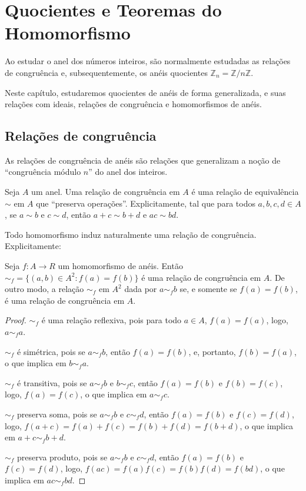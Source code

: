 \chapter{Quocientes e Teoremas do Homomorfismo}

Ao estudar o anel dos números inteiros, são normalmente estudadas as relações de congruência e, subsequentemente, os anéis quocientes $\mathbb Z_n=\mathbb Z/n\mathbb Z$.

Neste capítulo, estudaremos quocientes de anéis de forma generalizada, e suas relações com ideais, relações de congruência e homomorfismos de anéis.

\section{Relações de congruência}
As relações de congruência de anéis são relações que generalizam a noção de ``congruência módulo $n$'' do anel dos inteiros.

\begin{definition}
    Seja $A$ um anel. Uma relação de congruência em $A$ é uma relação de equivalência $\sim$ em $A$ que ``preserva operações''.
    Explicitamente, tal que para todos $a, b, c, d \in A$, se $a\sim b$ e $c\sim d$, então $a+c\sim b+d$ e $ac\sim bd$.
\end{definition}

Todo homomorfismo induz naturalmente uma relação de congruência.
Explicitamente:

\begin{prop}
Seja $f: A\rightarrow R$ um homomorfismo de anéis.
Então $\sim_f=\{(a, b) \in A^2: f(a)=f(b)\}$ é uma relação de congruência em $A$.
De outro modo, a relação $\sim_f$ em $A^2$ dada por $a \sim_f b$ se, e somente se $f(a)=f(b)$, é uma relação de congruência em $A$.
\end{prop}

\begin{proof}
    $\sim_f$ é uma relação reflexiva, pois para todo $a \in A$, $f(a)=f(a)$, logo, $a\sim_f a$.

    $\sim_f$ é simétrica, pois se $a\sim_f b$, então $f(a)=f(b)$, e, portanto, $f(b)=f(a)$, o que implica em $b\sim_f a$.

    $\sim_f$ é transitiva, pois se $a\sim_f b$ e $b\sim_f c$, então $f(a)=f(b)$ e $f(b)=f(c)$, logo, $f(a)=f(c)$, o que implica em $a\sim_f c$.

    $\sim_f$ preserva soma, pois se $a\sim_f b$ e $c\sim_f d$, então $f(a)=f(b)$ e $f(c)=f(d)$, logo, $f(a+c)=f(a)+f(c)=f(b)+f(d)=f(b+d)$, o que implica em $a+c\sim_f b+d$.

    $\sim_f$ preserva produto, pois se $a\sim_f b$ e $c\sim_f d$, então $f(a)=f(b)$ e $f(c)=f(d)$, logo, $f(ac)=f(a)f(c)=f(b)f(d)=f(bd)$, o que implica em $ac\sim_f bd$.
\end{proof}

